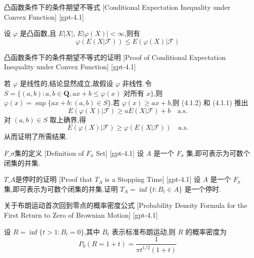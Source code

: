 \documentclass[UTF8]{ctexart}
\begin{document}
    
    
    \begin{thm}
        {凸函数条件下的条件期望不等式}
        [Conditional Expectation Inequality under Convex Function]
        [gpt-4.1]
        
设 $\varphi$ 是凸函数,且 $E|X|$, $E|\varphi(X)| < \infty$,则有
\[
\varphi ( E ( X | { \mathcal { F } } ) ) \leq E ( \varphi ( X ) | { \mathcal { F } } )
\]

    \end{thm}
    
    
    
    \begin{prf}
        {凸函数条件下的条件期望不等式的证明}
        [Proof of Conditional Expectation Inequality under Convex Function]
        [gpt-4.1]
        
若 $\varphi$ 是线性的,结论显然成立,故假设 $\varphi$ 非线性.令 $S = \{ (a, b) : a, b \in \mathbf{Q}, a x + b \leq \varphi(x) \text{ 对所有 } x \}$,则 $\varphi(x) = \sup\{a x + b : (a, b) \in S\}$.若 $\varphi(x) \geq a x + b$,则 (4.1.2) 和 (4.1.1) 推出
\[
E ( \varphi ( X ) | { \mathcal { F } } ) \geq a E ( X | { \mathcal { F } } ) + b \quad \mathrm{a.s.}
\]
对 $(a, b) \in S$ 取上确界,得
\[
E ( \varphi ( X ) | { \mathcal { F } } ) \geq \varphi ( E ( X | { \mathcal { F } } ) ) \quad \mathrm{a.s.}
\]
从而证明了所需结果.

    \end{prf}
    
    
    
    \begin{dfn}
        {$F\_{\sigma}$集的定义}
        [Definition of $F_{\sigma}$ Set]
        [gpt-4.1]
        设 $A$ 是一个 $F_{\sigma}$ 集,即可表示为可数个闭集的并集.
    \end{dfn}
    
    
    
    \begin{thm}
        {$T\_A$是停时的证明}
        [Proof that $T_A$ is a Stopping Time]
        [gpt-4.1]
        设 $A$ 是一个 $F_{\sigma}$ 集,即可表示为可数个闭集的并集.证明 $T_A = \inf \{ t : B_t \in A \}$ 是一个停时.
    \end{thm}
    
    
    
    \begin{thm}
        {关于布朗运动首次回到零点的概率密度公式}
        [Probability Density Formula for the First Return to Zero of Brownian Motion]
        [gpt-4.1]
        
设 $R = \operatorname*{inf} \{ t > 1 : B_{t} = 0 \}$,其中 $B_t$ 表示标准布朗运动,则 $R$ 的概率密度为
\[
P_{0} ( R = 1 + t ) = \frac{1}{\pi t^{1/2} ( 1 + t )}
\]

    \end{thm}
    
\end{document}
